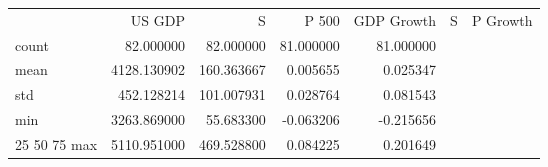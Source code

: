 \begin{tabular}{lrrrr}
 & US GDP & S&P 500 & GDP Growth & S&P Growth \\
count & 82.000000 & 82.000000 & 81.000000 & 81.000000 \\
mean & 4128.130902 & 160.363667 & 0.005655 & 0.025347 \\
std & 452.128214 & 101.007931 & 0.028764 & 0.081543 \\
min & 3263.869000 & 55.683300 & -0.063206 & -0.215656 \\
25%
50%
75%
max & 5110.951000 & 469.528800 & 0.084225 & 0.201649 \\
\end{tabular}
